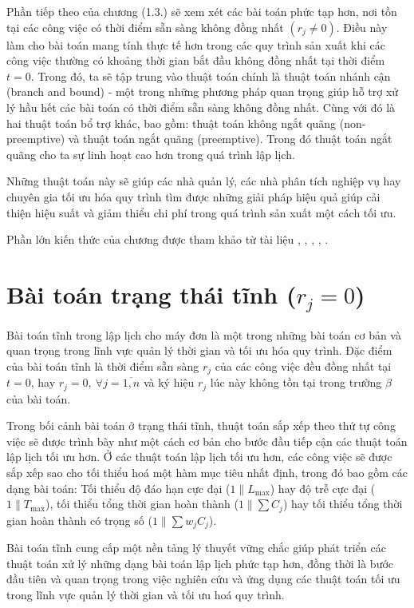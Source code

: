 \documentclass[12pt,a4paper]{report}
\begin{document}
Phần tiếp theo của chương (1.3.) sẽ xem xét các bài toán phức tạp hơn, nơi tồn tại các công việc có thời điểm sẵn sàng không đồng nhất $(r_j \neq 0)$. Điều này làm cho bài toán mang tính thực tế hơn trong các quy trình sản xuất khi các công việc thường có khoảng thời gian bắt đầu không đồng nhất tại thời điểm $t=0$. Trong đó, ta sẽ tập trung vào thuật toán chính là thuật toán nhánh cận (branch and bound) - một trong những phương pháp quan trọng giúp hỗ trợ xử lý hầu hết các bài toán có thời điểm sẵn sàng không đồng nhất. Cùng với đó là hai thuật toán bổ trợ khác, bao gồm: thuật toán không ngắt quãng (non-preemptive) và thuật toán ngắt quãng (preemptive). Trong đó thuật toán ngắt quãng cho ta sự linh hoạt cao hơn trong quá trình lập lịch.

Những thuật toán này sẽ giúp các nhà quản lý, các nhà phân tích nghiệp vụ hay chuyên gia tối ưu hóa quy trình tìm được những giải pháp hiệu quả giúp cải thiện hiệu suất và giảm thiểu chi phí trong quá trình sản xuất một cách tối ưu.

Phần lớn kiến thức của chương được tham khảo từ tài liệu \cite{minhhuy}, \cite{inbook}, \cite{pinedo2009planning}, \cite{PMBOK2013}, \cite{PostekZoccaAMPL2024}.

\section{Bài toán trạng thái tĩnh ($r_j = 0$)}
Bài toán tĩnh trong lập lịch cho máy đơn là một trong những bài toán cơ bản và quan trọng trong lĩnh vực quản lý thời gian và tối ưu hóa quy trình. Đặc điểm của bài toán tĩnh là thời điểm sẵn sàng $r_j$ của các công việc đều đồng nhất tại $t=0$, hay $r_j = 0, \: \forall j=\overline{1,n}$ và ký hiệu $r_j$ lúc này không tồn tại trong trường $\beta$ của bài toán.

Trong bối cảnh bài toán ở trạng thái tĩnh, thuật toán sắp xếp theo thứ tự công việc sẽ được trình bày như một cách cơ bản cho bước đầu tiếp cận các thuật toán lập lịch tối ưu hơn. Ở các thuật toán lập lịch tối ưu hơn, các công việc sẽ được sắp xếp sao cho tối thiểu hoá một hàm mục tiêu nhất định, trong đó bao gồm các dạng bài toán: Tối thiểu độ đáo hạn cực đại ($1\|L_{\max}$) hay độ trễ cực đại ($1\|T_{\max}$), tối thiểu tổng thời gian hoàn thành ($1\|\sum C_j$) hay tối thiểu tổng thời gian hoàn thành có trọng số ($1\|\sum w_j C_j$).

Bài toán tĩnh cung cấp một nền tảng lý thuyết vững chắc giúp phát triển các thuật toán xử lý những dạng bài toán lập lịch phức tạp hơn, đồng thời là bước đầu tiên và quan trọng trong việc nghiên cứu và ứng dụng các thuật toán tối ưu trong lĩnh vực quản lý thời gian và tối ưu hoá quy trình.
\end{document}
